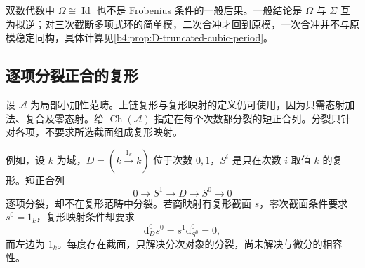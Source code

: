 \ProseParagraphBreak
双数代数中 \(\Omega\cong\operatorname{Id}\) 也不是 Frobenius 条件的一般后果。一般结论是 \(\Omega\) 与 \(\Sigma\) 互为拟逆；对三次截断多项式环的简单模，二次合冲才回到原模，一次合冲并不与原模稳定同构，具体计算见\cref{b4:prop:D-truncated-cubic-period}。

\subsection{逐项分裂正合的复形}
\label{b4:subsec:D02:03}

设 \(\mathcal A\) 为局部小加性范畴。上链复形与复形映射的定义仍可使用，因为只需态射加法、复合及零态射。给 \(\operatorname{Ch}(\mathcal A)\) 指定在每个次数都分裂的短正合列。分裂只针对各项，不要求所选截面组成复形映射。

\ProseParagraphBreak
例如，设 \(k\) 为域，\(D=(k\xrightarrow{1_k}k)\) 位于次数 \(0,1\)，\(S^i\) 是只在次数 \(i\) 取值 \(k\) 的复形。短正合列
\[
	0\longrightarrow S^1\longrightarrow D\longrightarrow S^0\longrightarrow0
\]
逐项分裂，却不在复形范畴中分裂。若商映射有复形截面 \(s\)，零次截面条件要求 \(s^0=1_k\)，复形映射条件却要求
\[
	\mathrm{d}_D^0s^0=s^1\mathrm{d}_{S^0}^0=0,
\]
而左边为 \(1_k\)。每度存在截面，只解决分次对象的分裂，尚未解决与微分的相容性。

